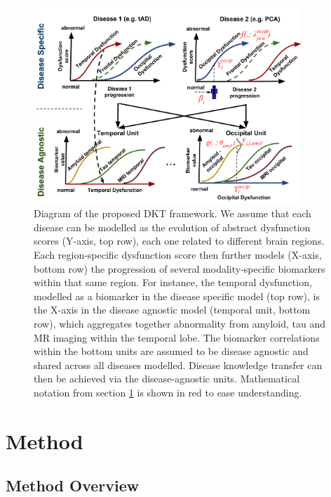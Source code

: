 \documentclass{llncs}
\begin{document}
\begin{figure}[h]
 \centering
 \includegraphics[width=0.9\textwidth,trim=0 0 0 0,clip]{figures/disease_knowledge_transfer_symbols.pdf}
 \caption{Diagram of the proposed DKT framework. We assume that each disease can be modelled as the evolution of abstract dysfunction scores (Y-axis, top row), each one related to different brain regions. Each region-specific dysfunction score then further models (X-axis, bottom row) the progression of several modality-specific biomarkers within that same region. For instance, the temporal dysfunction, modelled as a biomarker in the disease specific model (top row), is the X-axis in the disease agnostic model (temporal unit, bottom row), which aggregates together abnormality from amyloid, tau and MR imaging within the temporal lobe. The biomarker correlations within the bottom units are assumed to be disease agnostic and shared across all diseases modelled. Disease knowledge transfer can then be achieved via the disease-agnostic units. Mathematical notation from section \ref{sec:method} is shown in red to ease understanding.}
 \label{fig:diagram}
\end{figure}

\section{Method}
\label{sec:method}

\subsection{Method Overview}

\newcommand{\lp}{\lambda_{d_i}^{\psi(k)}}
\newcommand{\lpuu}{\lambda_{d_i}^{\psi(k),(u)}}
\newcommand{\lpum}{\lambda_{d_i}^{\psi(k),(u-1)}}
\end{document}
